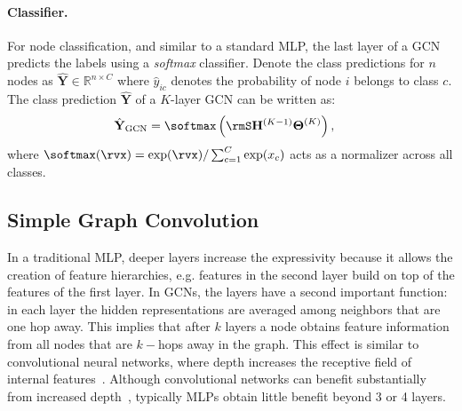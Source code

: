 \paragraph{Classifier.} For node classification, and similar to a standard MLP, the last layer of a GCN predicts the labels using a \textit{softmax} classifier. Denote the class predictions for $n$ nodes as $\hat{\mathbf{Y}} \in \mathbb{R}^{n\times C}$ where 
$\hat{y}_{ic}$ denotes the probability of node $i$ belongs to class $c$.
The class prediction $\hat{\mathbf{Y}}$ of a $K$-layer GCN can be written as:
\begin{align}
\hat{\mathbf{Y}}_{\text{GCN}} & = \softmax\left( \rmS \mathbf{H}^{(K-1)} \boldsymbol{\Theta}^{(K)}\right),
\end{align}
where $\softmax(\rvx) = \exp(\rvx) / \sum_{c=1}^C \exp(x_c)$ acts as a normalizer across all classes. 

\subsection{Simple Graph Convolution}
In a traditional MLP, deeper layers increase the expressivity because it allows the creation of feature hierarchies, e.g. features in the second layer build on top of the features of the first layer. In GCNs, the layers have a second important function: in each layer the hidden representations are averaged among neighbors that are one hop away. This implies that after $k$ layers a node obtains feature information from all nodes that are $k-$hops away in the graph. This effect is similar to convolutional neural networks, where depth increases the receptive field of internal features~\cite{hariharan2015hypercolumns}.  Although convolutional networks can benefit substantially from increased depth~\cite{huang2016deep}, typically MLPs obtain little benefit beyond 3 or 4 layers. 

